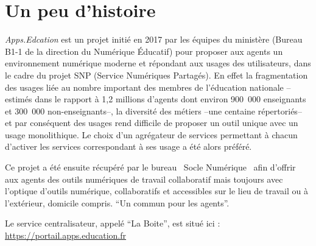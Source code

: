 \chapter{Un peu d'histoire}

\emph{Apps.Edcation} est un projet initié en 2017 par les équipes du ministère (Bureau B1-1 de la direction du Numérique Éducatif) pour proposer aux agents un environnement numérique  moderne et répondant aux usages des utilisateurs, dans le cadre du projet SNP (Service Numériques Partagés). 
En effet la fragmentation des usages liée au nombre important des membres de l'éducation nationale --estimés dans le rapport à 1,2 millions d'agents dont environ 900~000 enseignants et 300~000 non-enseignants--, la diversité des métiers --une centaine répertoriés-- et par conséquent des usages rend difficile de proposer un outil unique avec un usage monolithique. 
Le choix d'un agrégateur de services permettant à chacun d'activer les services correspondant à ses usage a été alors préféré.

Ce projet a été ensuite récupéré par le bureau \og~Socle Numérique~\fg{} afin d'offrir aux agents des outils numériques de travail collaboratif mais toujours avec l'optique d'outils numérique, collaboratifs et accessibles sur le lieu de travail ou à l'extérieur, domicile compris. ``Un commun pour les agents''.

Le service centralisateur, appelé ``La Boite'',  est situé ici : \url{https://portail.apps.education.fr}

